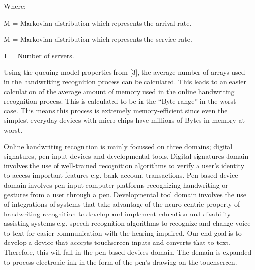 Where:

\hspace{10mm} M = Markovian distribution which represents the arrival rate.

\hspace{10mm} M = Markovian distribution which represents the service rate.

\hspace{10mm} 1 = Number of servers.

Using the queuing model properties from [3], the average number of arrays used in the handwriting recognition process can be calculated. This leads to an easier calculation of the average amount of memory used in the online handwriting recognition process. This is calculated to be in the “Byte-range” in the worst case. This means this process is extremely memory-efficient since even the simplest everyday devices with micro-chips have millions of Bytes in memory at worst.

Online handwriting recognition is mainly focussed on three domains; digital signatures, pen-input devices and developmental tools. Digital signatures domain involves the use of well-trained recognition algorithms to verify a user’s identity to access important features e.g. bank account transactions. Pen-based device domain involves pen-input computer platforms recognizing handwriting or gestures from a user through a pen. Developmental tool domain involves the use of integrations of systems that take advantage of the neuro-centric property of handwriting recognition to develop and implement education and disability-assisting systems e.g. speech recognition algorithms to recognize and change voice to text for easier communication with the hearing-impaired. Our end goal is to develop a device that accepts touchscreen inputs and converts that to text. Therefore, this will fall in the pen-based devices domain. The domain is expanded to process electronic ink in the form of the pen’s drawing on the touchscreen.

